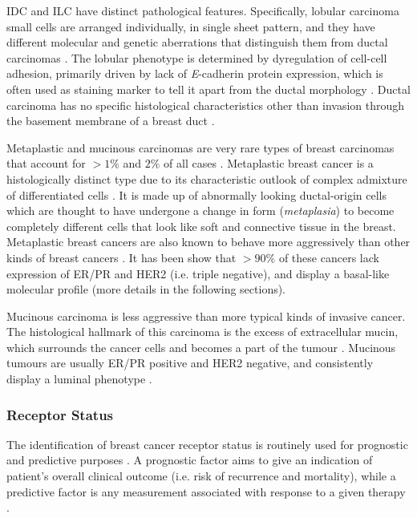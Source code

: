   IDC and ILC have distinct pathological features. Specifically, lobular carcinoma small cells are arranged individually, in single sheet pattern, and they have different molecular and genetic aberrations that distinguish them from ductal carcinomas \cite{weigelt2010molecular}. The lobular phenotype is determined by dyregulation of cell-cell adhesion, primarily driven by lack of \textit{E}-cadherin protein expression, which is often used as staining marker to tell it apart from the ductal morphology \cite{Abdelmessieh2016BreastOverview, Ciriello2015ComprehensiveCancer}. Ductal carcinoma has no specific histological characteristics other than invasion through the basement membrane of a breast duct \cite{Weigelt2008RefinementTypes}. 
   
    Metaplastic and mucinous carcinomas are very rare types of breast carcinomas that account for $>1\%$ and $2\%$ of all cases  \cite{Makki2015DiversityRelevance}. 
    Metaplastic breast cancer is a histologically distinct type due to its characteristic outlook of complex admixture of differentiated cells  \cite{Makki2015DiversityRelevance}. It is made up of abnormally looking ductal-origin cells which are thought to have undergone a change in form (\textit{metaplasia}) to become completely different cells that look like soft and connective tissue in the breast. Metaplastic breast cancers are also known to  behave more aggressively than other kinds of breast cancers \cite{schwartz2013metaplastic}. 
    It has been show that $>90\%$ of these cancers lack expression of ER/PR and HER2 (i.e. triple negative), and display a basal-like molecular profile \cite{Weigelt2010a} (more details in the following sections).


    Mucinous carcinoma is less aggressive than more typical kinds of invasive cancer. The histological hallmark of this carcinoma is the excess of extracellular mucin, which surrounds the cancer cells and becomes a part of the tumour \cite{dumitru2015mucinous}.  Mucinous tumours are usually ER/PR positive and HER2 negative, and consistently display a luminal phenotype \cite{Weigelt2010a}. 
    

   
    \subsubsection{Receptor Status}
    
    The identification of breast cancer receptor status is routinely used for prognostic and predictive  purposes \cite{Zaha2014}. A prognostic factor aims to give an indication of patient's overall clinical outcome (i.e. risk of recurrence and mortality), while a predictive factor is any measurement associated with response to a given therapy \cite{cianfrocca2004prognostic}. 
    
